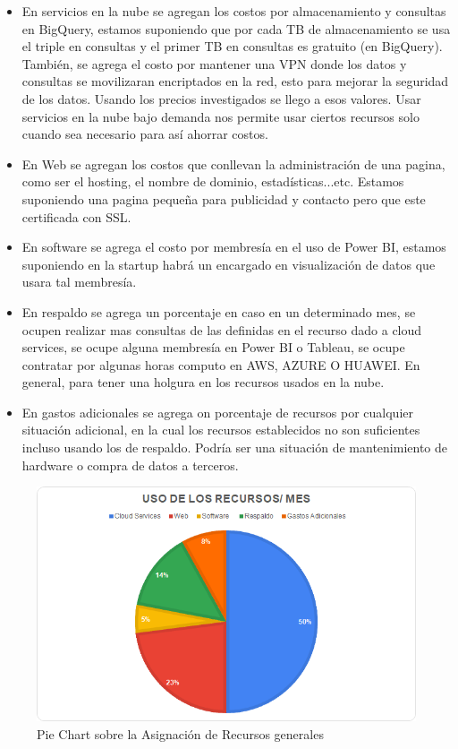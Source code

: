 \documentclass[12pt,a4paper,openright]{article}
\begin{document}
\begin{itemize}
    \item En servicios en la nube se agregan los costos por almacenamiento y consultas en BigQuery, estamos suponiendo que por cada TB de almacenamiento se usa el triple en consultas y el primer TB en consultas es gratuito (en BigQuery). También, se agrega el costo por mantener una VPN donde los datos y consultas se movilizaran encriptados en la red, esto para mejorar la seguridad de los datos. Usando los precios investigados se llego a esos valores. Usar servicios en la nube bajo demanda nos permite usar ciertos recursos solo cuando sea necesario para así ahorrar costos.
    \item En Web se agregan los costos que conllevan la administración de una pagina, como ser el hosting, el nombre de dominio, estadísticas...etc. Estamos suponiendo una pagina pequeña para publicidad y contacto pero que este certificada con SSL.
    \item En software se agrega el costo por membresía en el uso de Power BI, estamos suponiendo en la startup habrá un encargado en visualización de datos que usara tal membresía.
    \item En respaldo se agrega un porcentaje en caso en un determinado mes, se ocupen realizar mas consultas de las definidas en el recurso dado a cloud services, se ocupe alguna membresía en Power BI o Tableau, se ocupe contratar por algunas horas computo en AWS, AZURE O HUAWEI. En general, para tener una holgura en los recursos usados en la nube.
    \item En gastos adicionales se agrega on porcentaje de recursos por cualquier situación adicional, en la cual los recursos establecidos no son suficientes incluso usando los de respaldo. Podría ser una situación de mantenimiento de hardware o compra de datos a terceros.
\end{itemize}

\begin{figure}[h!]
\includegraphics[width=\textwidth]{TC1.png}
\centering
\caption{Pie Chart sobre la Asignaci\'on de Recursos generales}
\end{figure}
\end{document}
